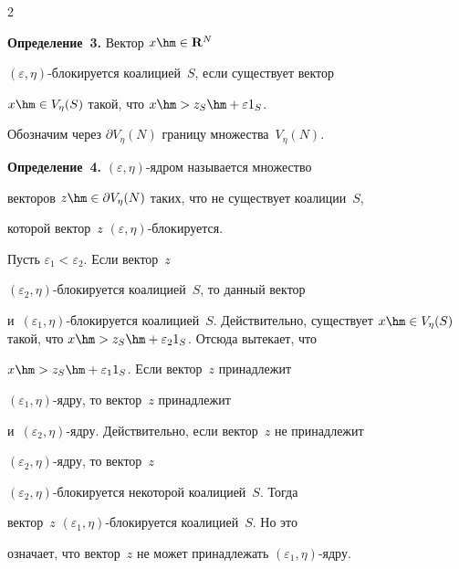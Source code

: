 \begin{multicols}{2}
    \noindent

\textbf{Определение~3.} Вектор $x\hm\in \mathbf{R}^N$ 

$(\varepsilon,\eta)$-бло\-ки\-ру\-ет\-ся коалицией~$S$, если существует вектор 

$x\hm\in V_\eta(S)$ такой, что $x\hm> z_S\hm+ \varepsilon 1_S$.



     \smallskip



Обозначим через $\partial V_\eta(N)$ границу множества~$V_\eta(N)$.



     \smallskip

     

    \noindent

\textbf{Определение~4.} $(\varepsilon,\eta)$-яд\-ром называется множество 

векторов $z\hm\in \partial V_\eta(N)$ таких, что не существует коалиции~$S$, 

которой вектор~$z$ $(\varepsilon,\eta)$-бло\-ки\-ру\-ется. 

    

Пусть $\varepsilon_1<\varepsilon_2$. Если вектор~$z$  

$(\varepsilon_2,\eta)$-бло\-ки\-ру\-ет\-ся коалицией~$S$, то данный вектор 

и~$(\varepsilon_1,\eta)$-бло\-ки\-ру\-ет\-ся коалицией~$S$. Действительно, существует $x\hm\in 

V_\eta(S)$ такой, что $x\hm > z_S\hm+ \varepsilon_2 1_S$. Отсюда вытекает, что 

$x\hm> z_S\hm+ \varepsilon_1 1_S$. Если вектор~$z$ принадлежит  

$(\varepsilon_1,\eta)$-яд\-ру, то вектор~$z$ принадлежит  

и~$(\varepsilon_2,\eta)$-яд\-ру. Действительно, если вектор~$z$ не принадлежит 

$(\varepsilon_2,\eta)$-яд\-ру, то вектор~$z$  

$(\varepsilon_2,\eta)$-бло\-ки\-ру\-ет\-ся некоторой коалицией~$S$. Тогда 

вектор~$z$ $(\varepsilon_1,\eta)$-бло\-ки\-ру\-ет\-ся коалицией~$S$. Но это 

означает, что вектор~$z$ не может принадлежать $(\varepsilon_1,\eta)$-ядру.



     \smallskip

     

    \noindent


\end{multicols}
